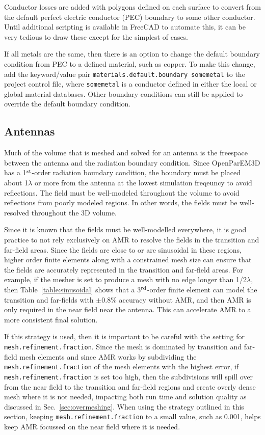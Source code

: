 \documentclass[titlepage]{article}
\renewcommand\_{\textunderscore\linebreak[1]}
\begin{document}
Conductor losses are added with polygons defined on each surface to convert from the default perfect electric conductor (PEC) boundary to some other conductor.  Until additional scripting is available in FreeCAD to automate this, it can be very tedious to draw these except for the simplest of cases.

If all metals are the same, then there is an option to change the default boundary condition from PEC to a defined material, such as copper.  To make this change, add the keyword/value pair \newline\texttt{materials.default.boundary some\_metal} to the project control file, where \texttt{some\_metal} is a conductor defined in either the local or global material databases.  Other boundary conditions can still be applied to override the default boundary condition.

\subsection{Antennas}

Much of the volume that is meshed and solved for an antenna is the freespace between the antenna and the radiation boundary condition.  Since OpenParEM3D has a 1$^{\textnormal{st}}$-order radiation boundary condition, the boundary must be placed about 1$\lambda$ or more from the antenna at the lowest simulation freqeuncy to avoid reflections.  The field must be well-modeled throughout the volume to avoid reflections from poorly modeled regions.  In other words, the fields must be well-resolved throughout the 3D volume.

Since it is known that the fields must be well-modelled everywhere, it is good practice to not rely exclusively on AMR to resolve the fields in the transition and far-field areas.  Since the fields are close to or are sinusoidal in these regions, higher order finite elements along with a constrained mesh size can ensure that the fields are accurately represented in the transition and far-field areas.  For example, if the mesher is set to produce a mesh with no edge longer than 1/2$\lambda$, then Table~\ref{table:sinusoidal} shows that a 3$^{\textnormal{rd}}$-order finite element can model the transition and far-fields with $\pm 0.8\%$ accuracy without AMR, and then AMR is only required in the near field near the antenna.  This can accelerate AMR to a more consistent final solution.

If this strategy is used, then it is important to be careful with the setting for \texttt{mesh.refinement.fraction}.  Since the mesh is dominated by transition and far-field mesh elements and since AMR works by subdividing the \texttt{mesh.refinement.fraction} of the mesh elements with the highest error, if \texttt{mesh.refinement.fraction} is set too high, then the subdivisions will spill over from the near field to the transition and far-field regions and create overly dense mesh where it is not needed, impacting both run time and solution quality as discussed in Sec.~\ref{sec:overmeshing}. When using the strategy outlined in this section, keeping \texttt{mesh.refinement.fraction} to a small value, such as 0.001, helps keep AMR focussed on the near field where it is needed. 
\end{document}
